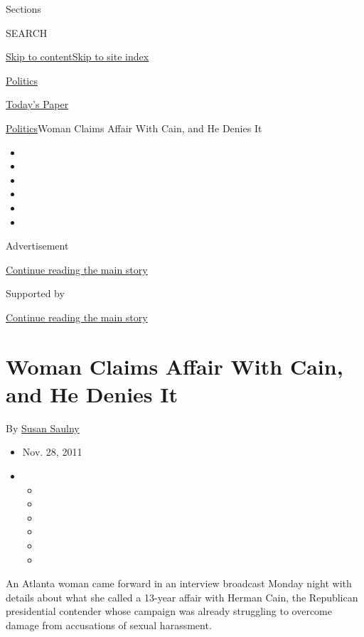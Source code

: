 Sections

SEARCH

\protect\hyperlink{site-content}{Skip to
content}\protect\hyperlink{site-index}{Skip to site index}

\href{https://www.nytimes.com/section/politics}{Politics}

\href{https://myaccount.nytimes.com/auth/login?response_type=cookie\&client_id=vi}{}

\href{https://www.nytimes.com/section/todayspaper}{Today's Paper}

\href{/section/politics}{Politics}\textbar{}Woman Claims Affair With
Cain, and He Denies It

\begin{itemize}
\item
\item
\item
\item
\item
\item
\end{itemize}

Advertisement

\protect\hyperlink{after-top}{Continue reading the main story}

Supported by

\protect\hyperlink{after-sponsor}{Continue reading the main story}

\hypertarget{woman-claims-affair-with-cain-and-he-denies-it}{%
\section{Woman Claims Affair With Cain, and He Denies
It}\label{woman-claims-affair-with-cain-and-he-denies-it}}

By \href{https://www.nytimes.com/by/susan-saulny}{Susan Saulny}

\begin{itemize}
\item
  Nov. 28, 2011
\item
  \begin{itemize}
  \item
  \item
  \item
  \item
  \item
  \item
  \end{itemize}
\end{itemize}

An Atlanta woman came forward in an interview broadcast Monday night
with details about what she called a 13-year affair with Herman Cain,
the Republican presidential contender whose campaign was already
struggling to overcome damage from accusations of sexual harassment.

